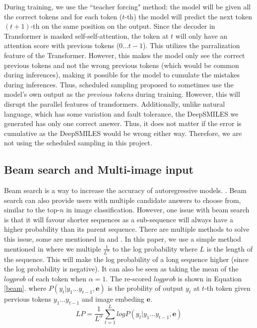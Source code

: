 \documentclass[12pt]{article}
\begin{document}
During training, we use the ``teacher forcing" method: the model will be given all the correct tokens and for each token ($t$-th) the model will predict the next token $(t+1)$-th on the same position on the output. Since the decoder in Transformer is masked self-self-attention, the token at $t$ will only have an attention score with previous tokens ($0\dots t-1$). This utilizes the parralization feature of the Transformer. However, this makes the model only see the correct previous tokens and not the wrong previous tokens (which would be common during inferences), making it possible for the model to cumulate the mistakes during inferences. \autocite{bengio_scheduled_2015} Thus, scheduled sampling \autocite{bengio_scheduled_2015} proposed to sometimes use the model's own output as the \textit{previous tokens} during training. However, this will disrupt the parallel features of transformers. Additionally, unlike natural language, which has some variation and fault tolerance, the DeepSMILES we generated has only one correct answer. Thus, it does not matter if the error is cumulative as the DeepSMILES would be wrong either way. Therefore, we are not using the scheduled sampling in this project. 

\subsection{Beam search and Multi-image input}
Beam search is a way to increase the accuracy of autoregressive models. \autocite{yang_breaking_2018} \autocite{zhang_beam_2024}. Beam search can also provide users with multiple candidate answers to choose from, similar to the top-$n$ in image classification. However, one issue with beam search is that it will favour shorter sequences as a sub-sequence will always have a higher probability than its parent sequence. \autocite{yang_breaking_2018} \autocite{zhang_beam_2024} There are multiple methods to solve this issue, some are mentioned in \autocite{yang_breaking_2018} and \autocite{zhang_beam_2024}. In this paper, we use a simple method mentioned in \autocite{zhang_beam_2024} where we multiple $\frac{1}{L^\alpha}$ to the log probability where $L$ is the length of the sequence. This will make the log probability of a long sequence higher (since the log probability is negative). It can also be seen as taking the mean of the $logprob$ of each token when $\alpha=1$. The re-scored $logprob$ is shown in Equation \ref{beam}.\cite{zhang_beam_2024} where $P(y_t|y_1\dots y_{t-1}, \textbf{e})$ is the probility of output $y_t$ at $t$-th token given pervious tokens $y_1\dots y_{t-1}$ and image embeding $\textbf{e}$. 
\begin{equation}
    LP = \frac{1}{L^{\alpha}}\sum_{t=1}^{L}logP(y_t|y_1\dots y_{t-1}, \textbf{e})
    \label{beam}
\end{equation}
\end{document}

